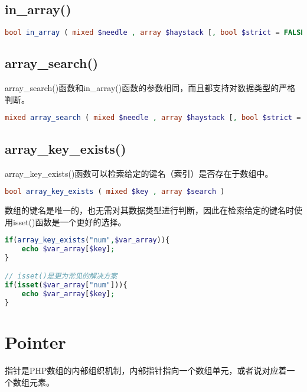 \subsection{in\_array()}




\begin{lstlisting}[language=PHP]
bool in_array ( mixed $needle , array $haystack [, bool $strict = FALSE ] )
\end{lstlisting}

\subsection{array\_search()}

array\_search()函数和in\_array()函数的参数相同，而且都支持对数据类型的严格判断。





\begin{lstlisting}[language=PHP]
mixed array_search ( mixed $needle , array $haystack [, bool $strict = false ] )
\end{lstlisting}


\subsection{array\_key\_exists()}


array\_key\_exists()函数可以检索给定的键名（索引）是否存在于数组中。

\begin{lstlisting}[language=PHP]
bool array_key_exists ( mixed $key , array $search )
\end{lstlisting}

数组的键名是唯一的，也无需对其数据类型进行判断，因此在检索给定的键名时使用isset()函数是一个更好的选择。


\begin{lstlisting}[language=PHP]
if(array_key_exists("num",$var_array)){
	echo $var_array[$key];
}

// isset()是更为常见的解决方案
if(isset($var_array["num"])){
	echo $var_array[$key];
}
\end{lstlisting}

\section{Pointer}

指针是PHP数组的内部组织机制，内部指针指向一个数组单元，或者说对应着一个数组元素。


